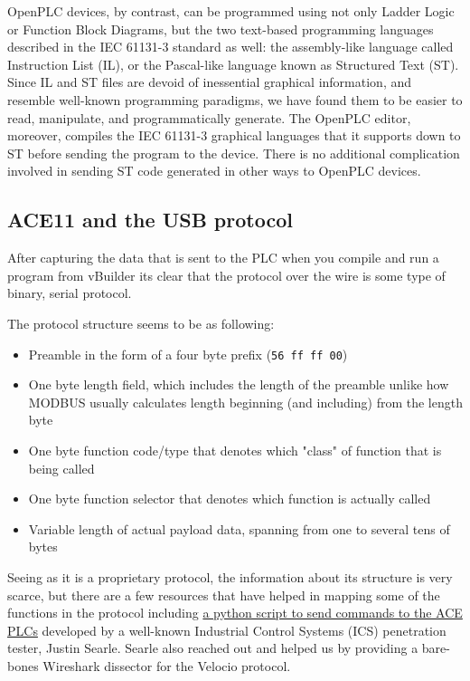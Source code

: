 \documentclass[11pt]{article}
\begin{document}
OpenPLC devices, by contrast, can be programmed using not only Ladder Logic or Function Block Diagrams, but the two text-based programming languages described in the IEC 61131-3 standard as well: the assembly-like language called Instruction List (IL), or the Pascal-like language known as Structured Text (ST). Since IL and ST files are devoid of inessential graphical information, and resemble well-known programming paradigms, we have found them to be easier to read, manipulate, and programmatically generate. The OpenPLC editor, moreover, compiles the IEC 61131-3 graphical languages that it supports down to ST before sending the program to the device. There is no additional complication involved in sending ST code generated in other ways to OpenPLC devices.

\subsection{ACE11 and the USB protocol}
\label{sec:orgb48ca9e}

After capturing the data that is sent to the PLC when you compile and run a program from vBuilder its clear that the protocol over the wire is some type of binary, serial protocol.

The protocol structure seems to be as following:

\begin{itemize}
\item Preamble in the form of a four byte prefix (\texttt{56 ff ff 00})
\item One byte length field, which includes the length of the preamble unlike how MODBUS usually calculates length beginning (and including) from the length byte
\item One byte function code/type that denotes which "class" of function that is being called
\item One byte function selector that denotes which function is actually called
\item Variable length of actual payload data, spanning from one to several tens of bytes
\end{itemize}

Seeing as it is a proprietary protocol, the information about its structure is very scarce, but there are a few resources that have helped in mapping some of the functions in the protocol including \href{https://github.com/ControlThings-io/ctVelocio}{a python script to send commands to the ACE PLCs} developed by a well-known Industrial Control Systems (ICS) penetration tester, Justin Searle.  Searle also reached out and helped us by providing a bare-bones Wireshark dissector for the Velocio protocol.
\end{document}
